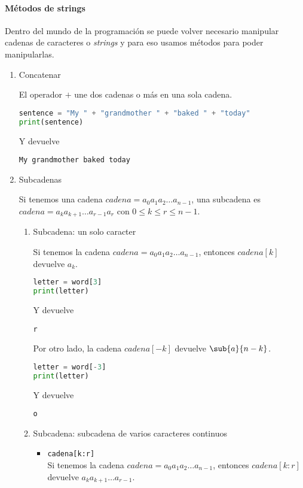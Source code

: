     \paragraph{Métodos de strings}\label{paragraph: metodos_subcadenas}
	Dentro del mundo de la programación se puede volver necesario manipular cadenas de caracteres o \emph{strings} y para eso usamos métodos para poder manipularlas.
	\begin{enumerate}
	    \item Concatenar\par 
	    El operador $ + $ une dos cadenas o más en una sola cadena.
	    \begin{lstlisting}[language={python}]
sentence = "My " + "grandmother " + "baked " + "today"
print(sentence)
    	\end{lstlisting}
    	Y devuelve
    	\begin{lstlisting}[language={[latex]tex}]
My grandmother baked today
	    \end{lstlisting}
	    \item Subcadenas\par 
	    Si tenemos una cadena $ cadena = a_{0}a_{1}a_{2}\ldots a_{n-1} $, una subcadena es $ cadena = a_{k}a_{k+1}\ldots a_{r-1}a_{r} $ con $ 0\leq k\leq r\leq n-1 $.
	    \begin{enumerate}
	        \item Subcadena: un solo caracter\par 
	        Si tenemos la cadena $ cadena = a_{0}a_{1}a_{2}\ldots a_{n-1} $, entonces $ cadena[k] $ devuelve $ a_{k} $.
	\begin{lstlisting}[language={python}]
letter = word[3]
print(letter)
	\end{lstlisting}
	Y devuelve
	\begin{lstlisting}[language={[latex]tex}]
r
	\end{lstlisting}
	Por otro lado, la cadena $cadena[-k]$ devuelve $\sub{a}{n-k}$.
	\begin{lstlisting}[language={python}]
letter = word[-3]
print(letter)
	\end{lstlisting}
	Y devuelve
	\begin{lstlisting}[language={[latex]tex}]
o
	\end{lstlisting}
	\item Subcadena: subcadena de varios caracteres continuos
	\begin{itemize}
		\item \texttt{cadena[k:r]}\\
		Si tenemos la cadena $ cadena = a_{0}a_{1}a_{2}\ldots a_{n-1} $, entonces $ cadena[k:r] $ devuelve $ a_{k}a_{k+1}\ldots a_{r-1} $. 

\end{itemize}
\end{enumerate}
\end{enumerate}
